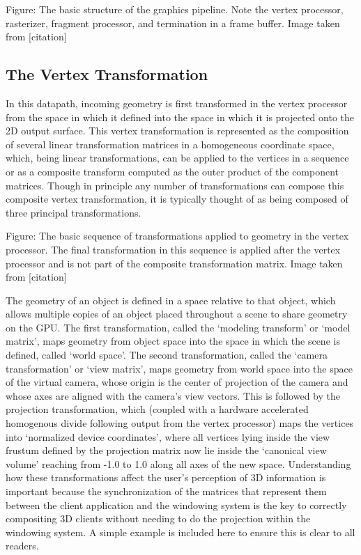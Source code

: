 Figure: The basic structure of the graphics pipeline. Note the vertex processor, rasterizer, fragment processor, and termination in a frame buffer. Image taken from [citation]

\subsection{The Vertex Transformation}
In this datapath, incoming geometry is first transformed in the vertex processor from the space in which it defined into the space in which it is projected onto the 2D output surface. This vertex transformation is represented as the composition of several linear transformation matrices in a homogeneous coordinate space, which, being linear transformations, can be applied to the vertices in a sequence or as a composite transform computed as the outer product of the component matrices. Though in principle any number of transformations can compose this composite vertex transformation, it is typically thought of as being composed of three principal transformations. 


Figure: The basic sequence of transformations applied to geometry in the vertex processor. The final transformation in this sequence is applied after the vertex processor and is not part of the composite transformation matrix. Image taken from [citation]

The geometry of an object is defined in a space relative to that object, which allows multiple copies of an object placed throughout a scene to share geometry on the GPU. The first transformation, called the ‘modeling transform’ or ‘model matrix’, maps geometry from object space into the space in which the scene is defined, called ‘world space’. The second transformation, called the ‘camera transformation’  or ‘view matrix’, maps geometry from world space into the space of the virtual camera, whose origin is the center of projection of the camera and whose axes are aligned with the camera’s view vectors. This is followed by the projection transformation, which (coupled with a hardware accelerated homogenous divide following output from the vertex processor) maps the vertices into ‘normalized device coordinates’, where all vertices lying inside the view frustum defined by the projection matrix now lie inside the ‘canonical view volume’ reaching from -1.0 to 1.0 along all axes of the new space.
Understanding how these transformations affect the user’s perception of 3D information is important because the synchronization of the matrices that represent them between the client application and the windowing system is the key to correctly compositing 3D clients without needing to do the projection within the windowing system. A simple example is included here to ensure this is clear to all readers.


